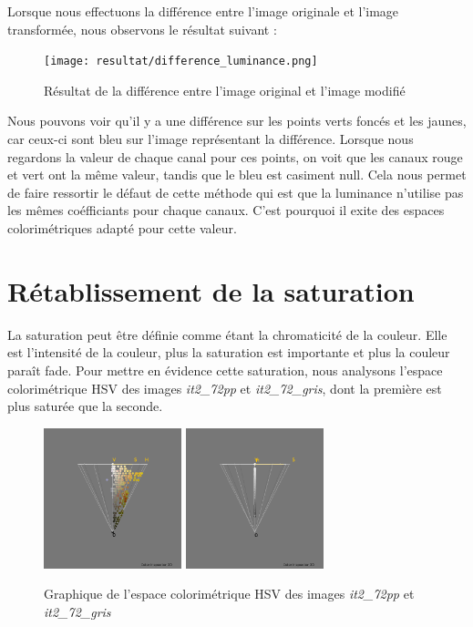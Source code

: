 \documentclass[a4paper,10pt]{article}
\begin{document}
Lorsque nous effectuons la différence entre l'image originale et l'image transformée, nous observons le résultat suivant :

\begin{figure}[!h]
 \begin{center}
 \texttt{[image: resultat/difference\_luminance.png]}
 \caption{Résultat de la différence entre l'image original et l'image modifié}
 \end{center}
\end{figure}

Nous pouvons voir qu'il y a une différence sur les points verts foncés et les jaunes, car ceux-ci sont bleu sur l'image représentant la différence. Lorsque nous regardons la valeur de chaque canal pour ces points, on voit que les canaux rouge et vert ont la même valeur, tandis que le bleu est casiment null. Cela nous permet de faire ressortir le défaut de cette méthode qui est que la luminance n'utilise pas les mêmes coéfficiants pour chaque canaux. C'est pourquoi il exite des espaces colorimétriques adapté pour cette valeur. 

\section{Rétablissement de la saturation}
La saturation peut être définie comme étant la chromaticité de la couleur. Elle est l'intensité de la couleur, plus
la saturation est importante et plus la couleur paraît fade. Pour mettre en évidence cette saturation, nous analysons
l'espace colorimétrique HSV des images \textit{it2\_72pp} et \textit{it2\_72\_gris}, dont la première est plus saturée
que la seconde.\\

\begin{figure}[!h]
 \begin{center}
 \includegraphics[width=4cm]{resultat/saturation1.png}
 \includegraphics[width=4cm]{resultat/saturation2.png}
 \caption{Graphique de l'espace colorimétrique HSV des images \textit{it2\_72pp} et \textit{it2\_72\_gris}}
 \end{center}
\end{figure}
\end{document}
